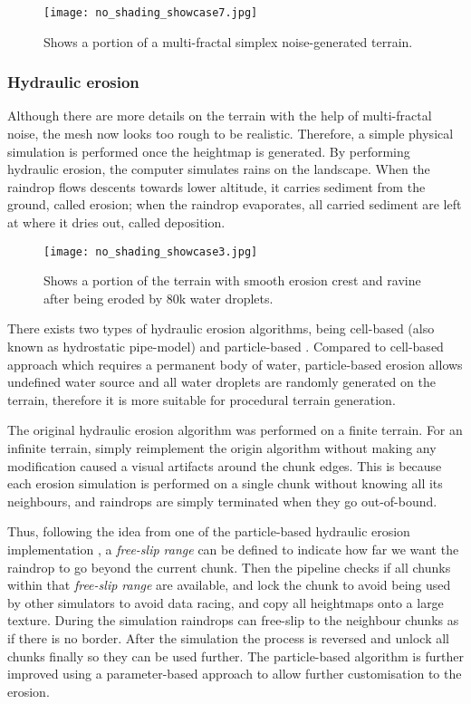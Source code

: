 \documentclass[oneside, a4paper]{article}
\begin{document}
    \begin{figure}[H]
        \texttt{[image: no\_shading\_showcase7.jpg]}
        \caption{Shows a portion of a multi-fractal simplex noise-generated terrain.}
    \end{figure}

    \subsubsection{Hydraulic erosion}

    Although there are more details on the terrain with the help of multi-fractal noise, the mesh now looks too rough to be realistic. Therefore, a simple physical simulation is performed once the heightmap is generated. By performing hydraulic erosion, the computer simulates rains on the landscape. When the raindrop flows descents towards lower altitude, it carries sediment from the ground, called erosion; when the raindrop evaporates, all carried sediment are left at where it dries out, called deposition.

    \begin{figure}[H]
        \texttt{[image: no\_shading\_showcase3.jpg]}
        \caption{Shows a portion of the terrain with smooth erosion crest and ravine after being eroded by 80k water droplets.}
    \end{figure}

    There exists two types of hydraulic erosion algorithms, being cell-based (also known as hydrostatic pipe-model) \cite{cell_based_erosion} and particle-based \cite{particle_based_erosion}. Compared to cell-based approach which requires a permanent body of water, particle-based erosion allows undefined water source and all water droplets are randomly generated on the terrain, therefore it is more suitable for procedural terrain generation.

    The original hydraulic erosion algorithm was performed on a finite terrain. For an infinite terrain, simply reimplement the origin algorithm without making any modification caused a visual artifacts around the chunk edges. This is because each erosion simulation is performed on a single chunk without knowing all its neighbours, and raindrops are simply terminated when they go out-of-bound.

    Thus, following the idea from one of the particle-based hydraulic erosion implementation \cite{cell_based_erosion}, a \textit{free-slip range} can be defined to indicate how far we want the raindrop to go beyond the current chunk. Then the pipeline checks if all chunks within that \textit{free-slip range} are available, and lock the chunk to avoid being used by other simulators to avoid data racing, and copy all heightmaps onto a large texture. During the simulation raindrops can free-slip to the neighbour chunks as if there is no border. After the simulation the process is reversed and unlock all chunks finally so they can be used further. The particle-based algorithm is further improved using a parameter-based approach \cite{parameter_particle_based} to allow further customisation to the erosion.
\end{document}
